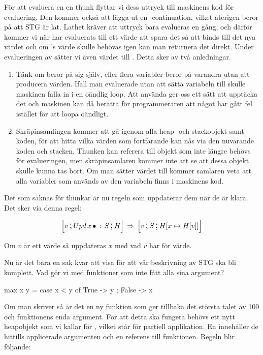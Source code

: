 \documentclass[../Core]{subfiles}
\begin{document}
För att evaluera en en thunk flyttar vi dess uttryck till maskinens kod
för evaluering. Den kommer också att lägga ut en -continuation, vilket
återigen beror på att STG är lat. Lathet kräver att uttryck bara evalueras
en gång, och därför kommer vi när  har evaluerats till ett värde att spara
det så att  binds till det nya värdet och om 's värde skulle behövas
igen kan man returnera det direkt. Under evalueringen av  sätter
vi även värdet  till . Detta sker av två anledningar.
\begin{enumerate}
\item Tänk om  beror på sig själv, eller flera variabler beror på varandra utan
att producera värden. Ifall man evaluerade utan att sätta variabeln till 
skulle maskinen falla in i en oändlig loop. Att använda  ger oss ett sätt att
upptäcka det och maskinen kan då berätta för programmeraren att något har gått fel
istället för att loopa oändligt.
\item Skräpinsamlingen kommer att gå igenom alla heap- och stackobjekt
samt koden, för att hitta vilka värden som fortfarande kan nås via den nuvarande
koden och stacken. Thunken kan referera till objekt som inte längre
behövs för evalueringen, men skräpinsamlaren kommer inte att se att dessa objekt skulle
kunna tas bort. Om man sätter värdet till 
kommer samlaren veta att alla variabler som används av den variabeln finns
i maskinens kod.
\end{enumerate}
Det som saknas för thunkar är nu regeln som uppdaterar dem när de
är klara. Det sker via denna regel:

\[
\text{\large$$}\Big[v \,\text{\Large;}\, Upd\, x\,\bullet \,:\, S \,\text{\Large;}\, H\Big] \,\Rightarrow\, \text{\large$$}\Big[v \,\text{\Large;}\, S \,\text{\Large;}\, H[x\mapsto H[v]]\Big]
\]

Om $v$ är ett värde så uppdateras $x$ med vad $v$ har för värde.

Nu är det bara en sak kvar att visa för att vår beskrivning av STG ska bli komplett.
Vad gör vi med funktioner som inte fått alla sina argument?

\begin{codeEx}
max x y = case x < y of
    { True  -> y
    ; False -> x
    }
\end{codeEx}

Om man skriver  så är det en ny funktion som
ger tillbaka det största talet av 100 och funktionens enda argument. För att
detta ska fungera behövs ett nytt heapobjekt som vi kallar för , vilket står för partiell
applikation. En  innehåller de hittills applicerade argumenten och en referens till funktionen.
Regeln blir följande:
\end{document}
